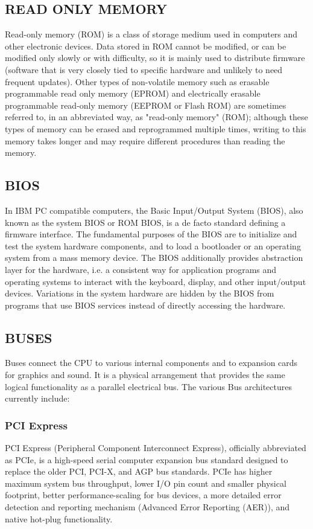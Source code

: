 \documentclass[a4paper,28pt,twoside,openright]{report}
\begin{document}
\subsection*{READ ONLY MEMORY}
	Read-only memory (ROM) is a class of storage medium used in computers and other electronic devices. Data
	stored in ROM cannot be modified, or can be modified only slowly or with difficulty, so it is mainly used to
	distribute firmware (software that is very closely tied to specific hardware and unlikely to need frequent
	updates). Other types of non-volatile memory such as erasable programmable read only memory (EPROM)
	and electrically erasable programmable read-only memory (EEPROM or Flash ROM) are sometimes referred to,
	in an abbreviated way, as "read-only memory" (ROM); although these types of memory can be erased and reprogrammed
	multiple times, writing to this memory takes longer and may require different procedures than
	reading the memory.
\subsection*{BIOS}
	In IBM PC compatible computers, the Basic Input/Output System (BIOS), also known as the system
	BIOS or ROM BIOS, is a de facto standard defining a firmware interface. The fundamental purposes of the
	BIOS are to initialize and test the system hardware components, and to load a bootloader or an operating
	system from a mass memory device. The BIOS additionally provides abstraction layer for the hardware, i.e. a
	consistent way for application programs and operating systems to interact with the keyboard, display, and other
	input/output devices. Variations in the system hardware are hidden by the BIOS from programs that use BIOS
	services instead of directly accessing the hardware.
\subsection*{BUSES}
	Buses connect the CPU to various internal components and to expansion cards for graphics and sound. It is a
	physical arrangement that provides the same logical functionality as a parallel electrical bus.\newline
	The various Bus architectures currently include:
\subsubsection*{PCI Express}
 	PCI Express (Peripheral Component Interconnect Express), officially abbreviated as PCIe, is
	 a high-speed serial computer expansion bus standard designed to replace the older PCI, PCI-X,
	 and AGP bus standards. PCIe has higher maximum system bus throughput, lower I/O pin count and smaller physical 		footprint,
	 better performance-scaling for bus devices, a more detailed error detection and reporting mechanism
	 (Advanced Error Reporting (AER)), and native hot-plug functionality.
\end{document}
